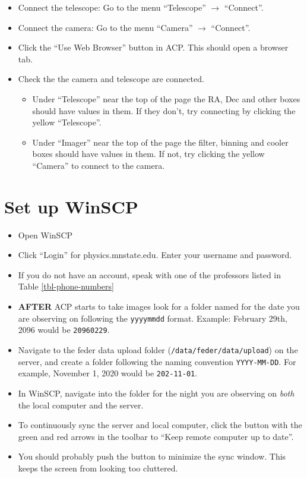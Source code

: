 \documentclass[letterpaper, 12pt]{report}
\begin{document}
\begin{itemize}
	\item Connect the telescope: Go to the menu ``Telescope'' $\to$ ``Connect''.
	\item Connect the camera: Go to the menu ``Camera'' $\to$ ``Connect''.
	\item Click the ``Use Web Browser'' button in ACP. This should open a browser tab.
	\item Check the the camera and telescope are connected.
	\begin{itemize}
		\item Under ``Telescope'' near the top of the page the RA, Dec and other boxes should have values in them. If they don't, try connecting by clicking the yellow ``Telescope''.
		\item Under ``Imager'' near the top of the page the filter, binning and cooler boxes should have values in them. If not, try clicking the yellow ``Camera'' to connect to the camera.
	\end{itemize}
\end{itemize}

\section{Set up WinSCP}
\begin{itemize}
	\item Open WinSCP
	\item Click ``Login'' for physics.mnstate.edu. Enter your username and password.
	\item If you do not have an account, speak with one of the professors listed in Table \ref{tbl-phone-numbers}
	\item \textbf{AFTER} ACP starts to take images look for a folder named for the date you are observing on following the \texttt{yyyymmdd} format. Example: February 29th, 2096 would be \texttt{20960229}.
	\item Navigate to the feder data upload folder (\texttt{/data/feder/data/upload}) on the server, and create a folder following the naming convention \texttt{YYYY-MM-DD}. For example, November 1, 2020 would be \texttt{202-11-01}.
	\item In WinSCP, navigate into the folder for the night you are observing on \emph{both} the local computer and the server.
	\item To continuously sync the server and local computer, click the button with the green and red arrows in the toolbar to ``Keep remote computer up to date''.
	\item You should probably push the button to minimize the sync window. This keeps the screen from looking too cluttered.
\end{itemize}
\end{document}
